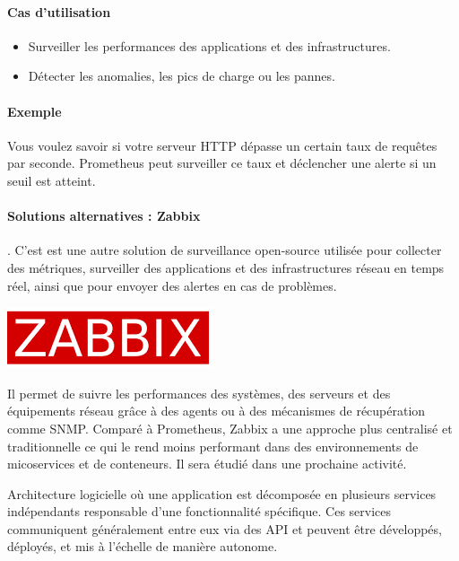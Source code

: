 \documentclass[french, 12pt]{article}%
\newcommand{\itemE}{\item[$\bullet$]}
\newcommand{\titreencadre}{Titre}
\newenvironment{encadre}[1]{\renewcommand{\titreencadre}{#1}
	\begin{mdframed}[style=encadrestyle]
	\vspace{0.5\baselineskip}
	}{%
	\end{mdframed}}
\begin{document}
\paragraph{Cas d'utilisation}
\begin{itemize}
    \itemE Surveiller les performances des applications et des infrastructures.
    \itemE Détecter les anomalies, les pics de charge ou les pannes.
\end{itemize}

\paragraph{Exemple}
Vous voulez savoir si votre serveur HTTP dépasse un certain taux de requêtes par seconde. Prometheus peut surveiller ce taux et déclencher une alerte si un seuil est atteint.

\vspace{0.5cm}
\begin{minipage}{0.75\linewidth}
\paragraph{Solutions alternatives : Zabbix}. C'est est une autre solution de surveillance open-source utilisée pour collecter des métriques, surveiller des applications et des infrastructures réseau en temps réel, ainsi que pour envoyer des alertes en cas de problèmes.
\end{minipage}
\begin{minipage}{0.25\linewidth}
\begin{center}
\includegraphics[scale=0.25]{./ressource/zabbix.png}
\end{center}
\end{minipage}

 Il permet de suivre les performances des systèmes, des serveurs et des équipements réseau grâce à des agents ou à des mécanismes de récupération comme SNMP. 
Comparé à Prometheus, Zabbix a une approche plus centralisé et traditionnelle ce qui le rend moins performant dans des environnements de micoservices et de conteneurs. Il sera étudié dans une prochaine activité.

\begin{encadre}{Microservices}
Architecture logicielle où une application est décomposée en plusieurs services indépendants responsable d'une fonctionnalité spécifique. Ces services communiquent généralement entre eux via des API et peuvent être développés, déployés, et mis à l'échelle de manière autonome.
\end{encadre}
\end{document}

